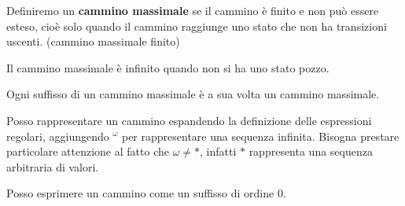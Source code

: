 \begin{definizione}
    Definiremo un \textbf{cammino massimale} se il cammino è finito e non può
    essere esteso, cioè solo quando il cammino raggiunge uno stato che non ha
    transizioni uscenti. (cammino massimale finito)
\end{definizione}
Il cammino massimale è infinito quando non si ha uno stato pozzo.
\begin{nota}
    Ogni suffisso di un cammino massimale è a sua volta un cammino massimale.
\end{nota}
Posso rappresentare un cammino espandendo la definizione delle espressioni
regolari, aggiungendo $^\omega$ per rappresentare una sequenza infinita. Bisogna
prestare particolare attenzione al fatto che $\omega \neq \ast$, infatti $\ast$
rappresenta una sequenza arbitraria di valori.
\begin{nota}
    Posso esprimere un cammino come un suffisso di ordine 0.
\end{nota}
